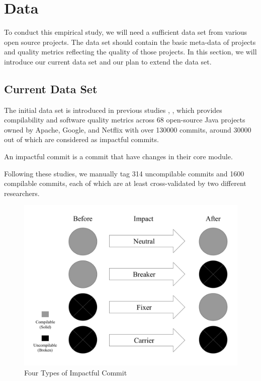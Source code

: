 \section{Data}

To conduct this empirical study, we will need a sufficient data set from various open source projects.
The data set should contain the basic meta-data of projects and quality metrics reflecting the quality of those projects.
In this section, we will introduce our current data set and our plan to extend the data set.

\subsection{Current Data Set}
\label{sec:data}

The initial data set is introduced in previous studies \cite{pooyan_esem}, \cite{pooyan_qrs}, which provides compilability and software quality metrics across 68 open-source Java projects owned by Apache, Google, and Netflix with over 130000 commits, around 30000 out of which are considered as impactful commits. 

An impactful commit is a commit that have changes in their core module.

Following these studies, we manually tag 314 uncompilable commits and 1600 compilable commits, each of which are at least cross-validated by two different researchers.

\begin{figure}[htbp]
    \centerline{\includegraphics[scale=0.3]{figures/terminology.pdf}}
    \caption{Four Types of Impactful Commit}
    \label{fig:terminology}
    \end{figure}


